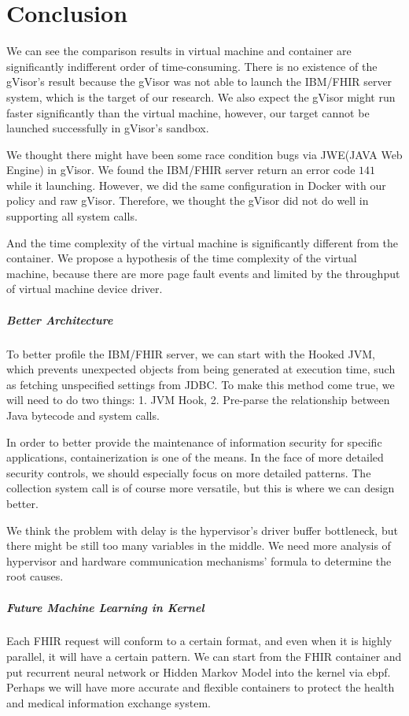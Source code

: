 \chapter{Conclusion}

We can see the comparison results in virtual machine and container are
significantly indifferent order of time-consuming. There is no existence
of the gVisor's result because the gVisor was not able to launch the
IBM/FHIR server system, which is the target of our research.
We also expect the gVisor might run faster significantly than the virtual
machine, however, our target cannot be launched successfully in
gVisor's sandbox.

We thought there might have been some race condition bugs via JWE(JAVA Web
Engine) in gVisor. We found the IBM/FHIR server return an error code $141$
while it launching. However, we did the same configuration in Docker with
our policy and raw gVisor. Therefore, we thought the gVisor did not do
well in supporting all system calls.

And the time complexity of the virtual machine is significantly different from
the container. We propose a hypothesis of the time complexity of the virtual
machine, because there are more page fault events and limited by the
throughput of virtual machine device driver\cite{10.5555/1267569.1267570,7095802}.

\paragraph{Better Architecture}
To better profile the IBM/FHIR server, we can start with the Hooked JVM,
which prevents unexpected objects from being generated at execution time,
such as fetching unspecified settings from JDBC. To make this method come
true, we will need to do two things: 1. JVM Hook, 2. Pre-parse the relationship
between Java bytecode and system calls.

In order to better provide the maintenance of information security for specific
applications, containerization is one of the means. In the face of more detailed
security controls, we should especially focus on more detailed patterns. The
collection system call is of course more versatile, but this is where we can
design better.

We think the problem with delay is the hypervisor's driver buffer bottleneck, but
there might be still too many variables in the middle. We need more analysis of
hypervisor and hardware communication mechanisms' formula to determine the root
causes.

\paragraph{Future Machine Learning in Kernel}
Each FHIR request will conform to a certain format, and even when it is highly
parallel, it will have a certain pattern. We can start from the FHIR container
and put recurrent neural network or Hidden Markov Model into the kernel via ebpf.
Perhaps we will have more accurate and flexible containers to protect the health
and medical information exchange system.
